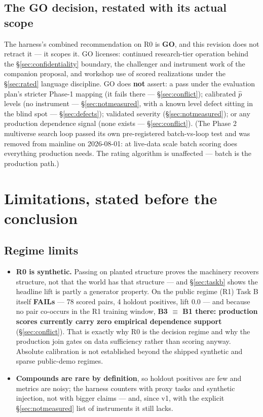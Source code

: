 \documentclass[11pt]{article}
\begin{document}
\subsection{The GO decision, restated with its actual scope}
\label{sec:go}

The harness's combined recommendation on R0 is \textbf{GO}, and this
revision does not retract it --- it scopes it. GO licenses: continued
research-tier operation behind the \S\ref{sec:confidentiality} boundary, the
challenger and instrument work of the companion proposal, and workshop use
of scored realizations under the \S\ref{sec:rated} language discipline. GO
does \textbf{not} assert: a pass under the evaluation plan's stricter
Phase-1 mapping (it fails there --- \S\ref{sec:conflict}); calibrated
$\hat p$ levels (no instrument --- \S\ref{sec:notmeasured}, with a known
level defect sitting in the blind spot --- \S\ref{sec:defects}); validated
severity (\S\ref{sec:notmeasured}); or any production dependence signal
(none exists --- \S\ref{sec:conflict}). (The Phase 2 multiverse search loop
passed its own pre-registered batch-vs-loop test and was removed from
mainline on 2026-08-01: at live-data scale batch scoring does everything
production needs. The rating algorithm is unaffected --- batch is the
production path.)

\section{Limitations, stated before the conclusion}
\label{sec:limitations}

\subsection{Regime limits}
\label{sec:regimes}

\begin{itemize}[leftmargin=1.4em]
\item \textbf{R0 is synthetic.} Passing on planted structure proves the
  machinery recovers structure, not that the world has that structure ---
  and \S\ref{sec:taskb} shows the headline lift is partly a generator
  property. On the public regime (R1) Task B itself \textbf{FAILs} --- 78
  scored pairs, 4 holdout positives, lift 0.0 --- and because no pair
  co-occurs in the R1 training window, \textbf{B3 $\equiv$ B1 there:
  production scores currently carry zero empirical dependence support}
  (\S\ref{sec:conflict}). That is exactly why R0 is the decision regime and
  why the production join gates on data sufficiency rather than scoring
  anyway. Absolute calibration is not established beyond the shipped
  synthetic and sparse public-demo regimes.
\item \textbf{Compounds are rare by definition}, so holdout positives are
  few and metrics are noisy; the harness counters with proxy tasks and
  synthetic injection, not with bigger claims --- and, since v1, with the
  explicit \S\ref{sec:notmeasured} list of instruments it still lacks.
\end{itemize}
\end{document}
